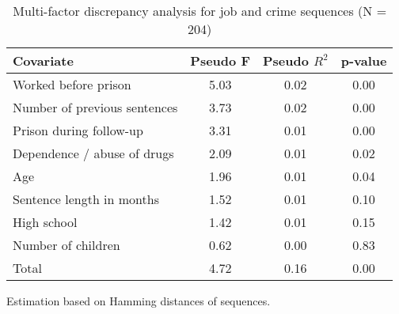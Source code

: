 \begin{table}[htp]
\footnotesize
\setlength{\tabcolsep}{10pt}
\renewcommand{\arraystretch}{1.3}
\begin{threeparttable}
\centering
\caption{Multi-factor discrepancy analysis for job and crime sequences (N = 204)} 
\label{tab:discrepancy_jobs_crime}
\begin{tabular}{lccc}
  \hline
Covariate & Pseudo F & Pseudo $R^2$ & p-value \\ 
  \hline
Worked before prison & 5.03 & 0.02 & 0.00 \\ 
  Number of previous sentences & 3.73 & 0.02 & 0.00 \\ 
  Prison during follow-up & 3.31 & 0.01 & 0.00 \\ 
  Dependence / abuse of drugs & 2.09 & 0.01 & 0.02 \\ 
  Age & 1.96 & 0.01 & 0.04 \\ 
  Sentence length in months & 1.52 & 0.01 & 0.10 \\ 
  High school & 1.42 & 0.01 & 0.15 \\ 
  Number of children & 0.62 & 0.00 & 0.83 \\ 
  Total & 4.72 & 0.16 & 0.00 \\ 
   \hline
\end{tabular}
\begin{tablenotes}
\scriptsize
\item Estimation based on Hamming distances of sequences.
\end{tablenotes}
\end{threeparttable}
\end{table}
